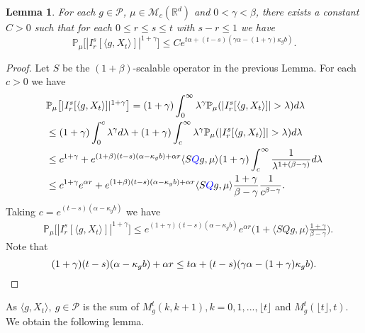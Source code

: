 \documentclass[12pt,oneside,english]{amsart}
\theoremstyle{plain}
\newtheorem{lem}[thm]{Lemma}
\theoremstyle{definition}
\numberwithin{equation}{section}
\newcommand{\added}[1]{{\color{blue}#1}}\newcommand{\deleted}[1]{{\color{red}#1}}
\begin{document}
\begin{lem}\label{lem: control of mgtrs}
    For each $g\in \mathcal P$, $\mu \in \mathcal M_c(\mathbb{R}^d)$ and $0<\gamma < \beta$, there exists a constant $C>0$ such that for each $0\leq r\leq s\leq t$ with $s-r \leq 1$ we have
\[
    \mathbb P_\mu\big[|I_r^s[\langle g, X_t\rangle]|^{1+\gamma}\big]
    \leq C e^{t\alpha+(t-s) (\gamma\alpha- (1+\gamma)\kappa_gb)}.
\]
\end{lem}

\begin{proof}
	\added{Let $S$ be the $(1+\beta)$-scalable operator in the previous Lemma.}
    For each $c>0$ we have
\begin{align}
    &\mathbb P_\mu\big[|I_r^s[\langle g, X_t\rangle]|^{1+\gamma}\big]
    = (1+\gamma)\int_0^\infty \lambda^{\gamma} \mathbb P_{\mu}(|I_r^s[\langle g, X_t\rangle]|>\lambda) d\lambda
    \\&\leq (1+\gamma)\int_0^c \lambda^{\gamma} d\lambda +(1+\gamma)\int_c^\infty \lambda^{\gamma}\mathbb P_\mu(|I_r^s[\langle g, X_t\rangle]|> \lambda) d\lambda
    \\& \leq c^{1+\gamma} + e^{(1+\beta)(t-s)(\alpha- \kappa_gb) + \alpha r} \langle S\added{Q}g,\mu\rangle  (1+\gamma)\int_c^\infty \frac{1}{\lambda^{1+(\beta-\gamma)}}d\lambda
    \\&\leq c^{1+\gamma} e^{\alpha r} + e^{(1+\beta)(t-s)(\alpha- \kappa_gb) + \alpha r} \langle S\added{Q}g,\mu\rangle   \frac{1+\gamma}{\beta - \gamma} \frac{1}{c^{\beta - \gamma}}.
\end{align}
    Taking $c = e^{(t-s)(\alpha- \kappa_gb)}$ we have
\begin{align}
    &\mathbb P_\mu\big[|I_r^s[\langle g, X_t\rangle]|^{1+\gamma}\big]
    \leq e^{(1+\gamma)(t-s)(\alpha- \kappa_gb)} e^{\alpha r}\Big(1+ \langle SQg,\mu\rangle \frac{1+\gamma}{\beta - \gamma}\Big).
\end{align}
    Note that
\[
    (1+\gamma)(t-s)(\alpha- \kappa_gb) + \alpha r
    \leq t\alpha+(t-s) (\gamma\alpha- (1+\gamma)\kappa_gb).
    \qedhere
\]
\end{proof}
\begin{comment}
\end{comment}
    \deleted{As $\langle g,X_t\rangle,~g\in \mathcal{P}$ is the sum of $M_g^t(k,k+1), k=0,1,...,\lfloor t\rfloor$ and $M_g^t(\lfloor t\rfloor, t)$. We obtain the following lemma.}
\end{document}
